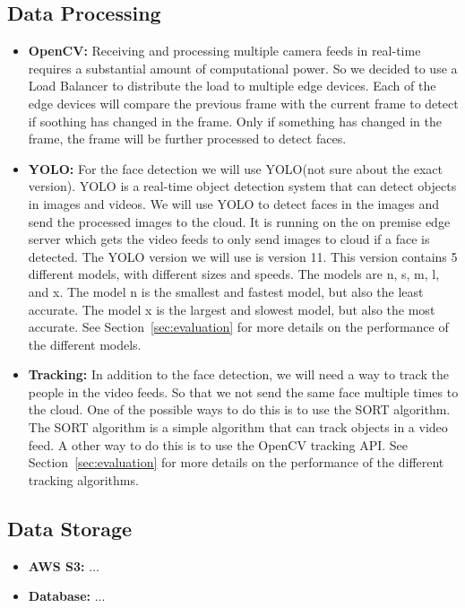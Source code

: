 \documentclass[conference]{IEEEtran}
\begin{document}
\subsection{Data Processing}
\begin{itemize}
    \item \textbf{OpenCV:} Receiving and processing multiple camera feeds in real-time requires a substantial amount of computational power.
          So we decided to use a Load Balancer to distribute the load to multiple edge devices.
          Each of the edge devices will compare the previous frame with the current frame to detect if soothing has changed in the frame.
          Only if something has changed in the frame, the frame will be further processed to detect faces. 
    \item \textbf{YOLO:} For the face detection we will use YOLO(not sure about the exact version). YOLO is a real-time object detection system that can detect objects in images and videos.
          We will use YOLO to detect faces in the images and send the processed images to the cloud. It is running on the on premise edge server which gets the video feeds to only
          send images to cloud if a face is detected. 
          The YOLO version we will use is version 11. This version contains 5 different models, with different sizes and speeds. The models are n, s, m, l, and x. 
          The model n is the smallest and fastest model, but also the least accurate. The model x is the largest and slowest model, but also the most accurate.
          See Section~\ref{sec:evaluation} for more details on the performance of the different models.
    \item \textbf{Tracking:} In addition to the face detection, we will need a way to track the people in the video feeds. So that we not send the same face multiple times to the cloud.
          One of the possible ways to do this is to use the SORT algorithm. The SORT algorithm is a simple algorithm that can track objects in a video feed. 
          A other way to do this is to use the OpenCV tracking API. See Section~\ref{sec:evaluation} for more details on the performance of the different tracking algorithms.
\end{itemize}
\subsection{Data Storage}
\begin{itemize}
    \item \textbf{AWS S3:} ...
    \item \textbf{Database:} ...
\end{itemize}
\end{document}
